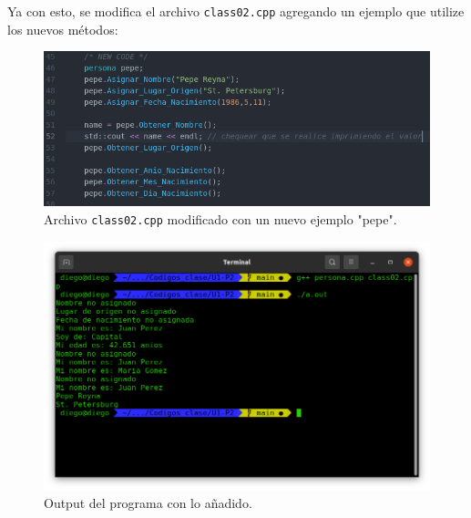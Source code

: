 Ya con esto, se modifica el archivo \texttt{class02.cpp} agregando un ejemplo que utilize los nuevos métodos:
\begin{figure}[H]
	\centering
	\includegraphics[scale=0.5]{./img/class02.png}
	\caption{Archivo \texttt{class02.cpp} modificado con un nuevo ejemplo "pepe".}
	\label{class02}
\end{figure}


\begin{figure}[H]
	\centering
	\includegraphics[scale=0.35]{./img/output.png}
	\caption{Output del programa con lo añadido.}
	\label{class02}
\end{figure}
